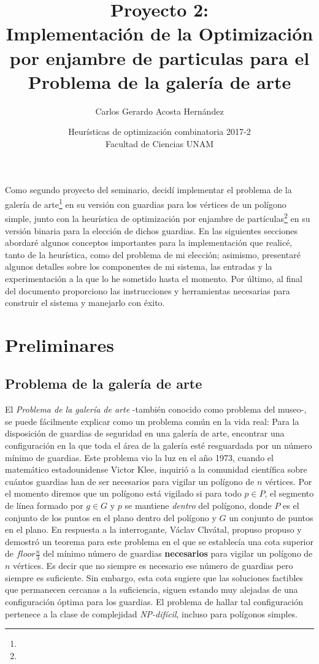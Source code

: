 \documentclass[12pt]{article}
\title{Proyecto 2:\\ Implementación de la Optimización por enjambre de particulas para el Problema de la galería de arte }
\author{Carlos Gerardo Acosta Hernández}
\date{Heurísticas de optimización combinatoria 2017-2\\ Facultad de Ciencias UNAM}
\begin{document}
\maketitle
Como segundo proyecto del seminario, decidí implementar el problema de la galería de arte\footnote{} en su
versión con guardias para los vértices de un polígono simple, junto con la heurística de optimización por
enjambre de partículas\footnote{} en su versión binaria para la elección de dichos guardias. En las siguientes secciones abordaré algunos conceptos
importantes para la implementación que realicé, tanto de la heurística, como del problema de mi elección; asimismo, presentaré algunos detalles sobre los componentes de mi sistema, las
entradas y la experimentación a la que lo he sometido hasta el momento. Por último, al final del documento proporciono las instrucciones y herramientas necesarias para construir el sistema y manejarlo con éxito.
\section{Preliminares}
\subsection{Problema de la galería de arte}
El \textit{Problema de la galería de arte} -también conocido como problema del museo-, se puede fácilmente explicar como un problema común en la vida real: Para la disposición de guardias de seguridad en una
galería de arte, encontrar una configuración en la que toda el área de la galería esté resguardada por un número mínimo de guardias. Este problema vio la luz en el año 1973, cuando el matemático estadounidense Victor Klee, inquirió a la comunidad científica sobre cuántos guardias han de ser necesarios para vigilar un polígono de $n$ vértices. Por el momento diremos que un polígono está vigilado si para todo $p \in P$, el segmento de línea formado por
$g \in G$ y $p$ se mantiene \textit{dentro} del polígono, donde $P$ es el conjunto de los puntos en el plano dentro del polígono y $G$ un conjunto de puntos en el plano. En respuesta a la interrogante, Václav Chvátal, propuso propuso y demostró un teorema para este problema en el que se establecía una cota superior de $floor \frac{n}{3}$ del mínimo número de guardias \textbf{necesarios} para vigilar un polígono de $n$ vértices. Es
decir que no siempre es necesario ese número de guardias pero siempre es suficiente. Sin embargo, esta cota sugiere que las soluciones factibles que permanecen cercanas a la suficiencia, siguen estando muy alejadas de
una configuración óptima para los guardias. El problema de hallar tal configuración pertenece a la clase de complejidad \textit{NP-difícil}, incluso para polígonos simples. %
\end{document}
